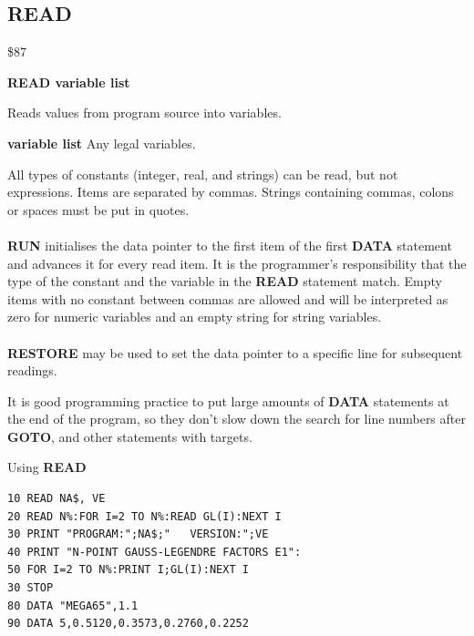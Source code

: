 \subsection{READ}
\begin{description}[leftmargin=2cm,style=nextline]
\item [Token:] \$87
\item [Format:] {\bf READ variable list}
\item [Usage:]  Reads values from program source into variables.

               {\bf variable list} Any legal variables.

               All types of constants (integer, real, and
               strings) can be read, but not expressions.
               Items are separated by commas.
               Strings containing commas, colons or spaces must be put
               in quotes. \\
               \\
               {\bf RUN} initialises the data pointer
               to the first item of the first {\bf DATA} statement
               and advances it for every read item. It is the
               programmer's responsibility that the type of
               the constant and the variable in the {\bf READ}
               statement match. Empty items with no constant
               between commas are allowed and will be interpreted as
               zero for numeric variables and an empty string for
               string variables. \\
               \\
               {\bf RESTORE} may be used to set the
               data pointer to a specific line for subsequent
               readings.

\item [Remarks:] It is good programming practice to put large amounts of
                 {\bf DATA} statements at the end of the program,
                 so they don't slow down the search for line numbers
                 after {\bf GOTO}, and other statements with targets.

\item [Example:] Using {\bf READ}
\begin{tcolorbox}[colback=black,coltext=white]
\verbatimfont{\codefont}
\begin{verbatim}
10 READ NA$, VE
20 READ N%:FOR I=2 TO N%:READ GL(I):NEXT I
30 PRINT "PROGRAM:";NA$;"   VERSION:";VE
40 PRINT "N-POINT GAUSS-LEGENDRE FACTORS E1":
50 FOR I=2 TO N%:PRINT I;GL(I):NEXT I
30 STOP
80 DATA "MEGA65",1.1
90 DATA 5,0.5120,0.3573,0.2760,0.2252
\end{verbatim}
\end{tcolorbox}
\end{description}

